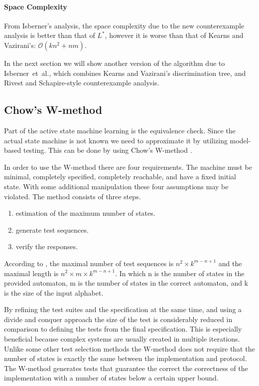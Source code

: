 \documentclass[multi,crop=false,class=article]{standalone}
\begin{document}
\paragraph{Space Complexity} From Isberner's analysis\cite{Isberner14b}, the
space complexity due to the new counterexample analysis is better than that of
$L^*$, however it is worse than that of Kearns and Vazirani's:
$\mathcal{O}(kn^2 + nm)$.

In the next section we will show another version of the algorithm due to
Isberner~et~al., which combines Kearns and Vazirani's discrimination tree, and
Rivest and Schapire-style counterexample analysis.

\subsection{Chow's W-method}
Part of the active state machine learning is the equivalence check.
Since the actual state machine is not known we need to approximate it by utilizing model-based testing.
This can be done by using Chow's W-method \cite{deRuiter15, Chow78}.

In order to use the W-method there are four requirements.
The machine must be minimal, completely specified, completely reachable, and have a fixed initial state.
With some additional manipulation these four assumptions may be violated.
The method consists of three steps.
\begin{enumerate}
\item estimation of the maximum number of states.
\item generate test sequences.
\item verify the responses.
\end{enumerate}

According to \cite{vasilevskii73}, the maximal number of test sequences is $n^{2} \times k^{m-n+1}$ and the maximal length is $n^{2} \times m \times k^{m-n+1}$.
In which n is the number of states in the provided automaton, m is the number of states in the correct automaton, and k is the size of the input alphabet.

By refining the test suites and the specification at the same time, and using a divide and conquer approach the size of the test is considerably reduced in comparison to defining the tests from the final specification\cite{Ipate07}.
This is especially beneficial because complex systems are usually created in multiple iterations.
Unlike some other test selection methods the W-method does not require that the number of states is exactly the same between the implementation and protocol.
The W-method generates tests that guarantee the correct the correctness of the implementation with a number of states below a certain upper bound.
\end{document}
